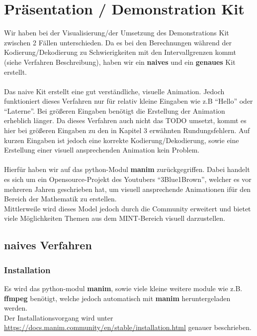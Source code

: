 \documentclass[a4paper]{article}
\theoremstyle{definition}
\theoremstyle{remark}
\begin{document}
			\section{Präsentation / Demonstration Kit}
Wir haben bei der Visualisierung/der Umsetzung des Demonstrations Kit zwischen 2 Fällen unterschieden. Da es bei den Berechnungen während der Kodierung/Dekodierung zu Schwierigkeiten mit den Intervallgrenzen kommt (siehe Verfahren Beschreibung), haben wir ein \textbf{naives} und ein \textbf{genaues} Kit erstellt.
\\
\\
Das naive Kit erstellt eine gut verständliche, visuelle Animation. Jedoch funktioniert dieses Verfahren nur für relativ kleine Eingaben wie z.B ``Hello'' oder ``Laterne''. Bei größeren Eingaben benötigt die Erstellung der Animation erheblich länger. Da dieses Verfahren auch nicht das TODO umsetzt, kommt es hier bei größeren Eingaben zu den in Kapitel 3 erwähnten Rundungsfehlern. Auf kurzen Eingaben ist jedoch eine korrekte
Kodierung/Dekodierung, sowie eine Erstellung einer visuell ansprechenden Animation kein Problem. 
\\
\\
Hierfür haben wir auf das python-Modul \textbf{manim} zurückgegriffen. Dabei handelt es sich um ein Opensource-Projekt des Youtubers ``3Blue1Brown'', welcher es vor mehreren Jahren geschrieben hat, um visuell ansprechende Animationen ifür den Bereich der Mathematik zu erstellen.
\\
Mittlerweile wird dieses Model jedoch durch die Community erweitert und bietet viele Möglichkeiten Themen aus dem MINT-Bereich visuell darzustellen.
\subsection{naives Verfahren}
\subsubsection{Installation}
Es wird das python-modul \textbf{manim}, sowie viele kleine weitere module wie z.B. \textbf{ffmpeg} benötigt, welche jedoch automatisch mit \textbf{manim} heruntergeladen werden.\\
Der Installationsvorgang wird unter \href{https://docs.manim.community/en/stable/installation.html}{https://docs.manim.community/en/stable/installation.html}
genauer beschrieben.
\\
\end{document}
